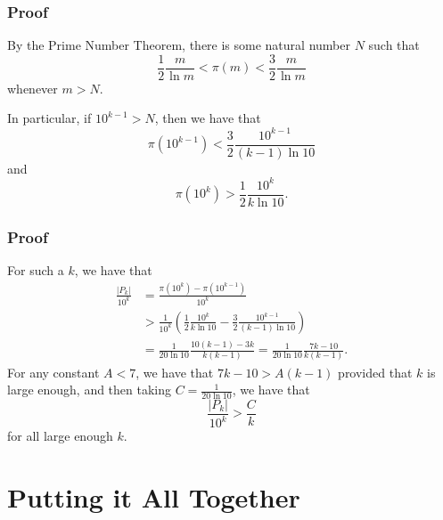 \documentclass{beamer}
\begin{document}
\begin{frame}
    \frametitle{Proof}

    By the Prime Number Theorem, there is some natural number $N$ such that
    \[
        \frac{1}{2} \frac{m}{\ln m} < \pi(m) < \frac{3}{2} \frac{m}{\ln m}
    \]
    whenever $m > N$.

    In particular, if $10^{k - 1} > N$, then we have that
    \[
        \pi\left( 10^{k - 1} \right) < \frac{3}{2} \frac{10^{k - 1}}{(k - 1) \ln 10}
    \]
    and
    \[
        \pi\left( 10^k \right) > \frac{1}{2} \frac{10^k}{k \ln 10}.
    \]

\end{frame}

\begin{frame}
    \frametitle{Proof}

    For such a $k$, we have that
    \begin{align*}
        \frac{\left| P_k \right|}{10^{k}} & = \frac{\pi\left( 10^{k} \right) - \pi\left( 10^{k - 1} \right)}{10^{k}} \\
        & > \frac{1}{10^k} \left( \frac{1}{2} \frac{10^k}{k \ln 10} - \frac{3}{2} \frac{10^{k - 1}}{(k - 1) \ln 10} \right) \\
        & = \frac{1}{20 \ln 10}\frac{10(k - 1) - 3k}{k(k - 1)} = \frac{1}{20 \ln 10} \frac{7k - 10}{k(k - 1)}.
    \end{align*}
    \pause
    For any constant $A < 7$, we have that $7k - 10 > A(k - 1)$ provided that $k$ is large enough, and then taking $C = \frac{1}{20 \ln 10}$, we have that
    \[
        \frac{\left| P_k \right|}{10^{k}} > \frac{C}{k}
    \]
    for all large enough $k$.

\end{frame}

\section{Putting it All Together}
\end{document}
